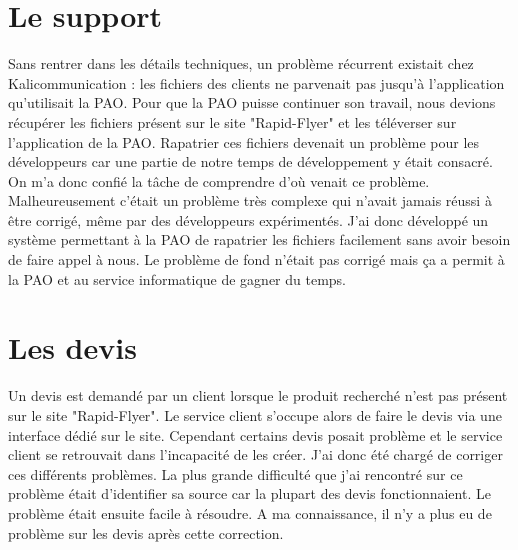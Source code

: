 
\section{Le support}
Sans rentrer dans les détails techniques, un problème récurrent existait chez Kalicommunication : les fichiers des clients ne parvenait pas jusqu'à l'application qu'utilisait la PAO. Pour que la PAO puisse continuer son travail, nous devions récupérer les fichiers présent sur le site "Rapid-Flyer" et les téléverser sur l'application de la PAO.\newline
Rapatrier ces fichiers devenait un problème pour les développeurs car une partie de notre temps de développement y était consacré.\newline
On m'a donc confié la tâche de comprendre d'où venait ce problème. Malheureusement c'était un problème très complexe qui n'avait jamais réussi à être corrigé, même par des développeurs expérimentés. J'ai donc développé un système permettant à la PAO de rapatrier les fichiers facilement sans avoir besoin de faire appel à nous. Le problème de fond n'était pas corrigé mais ça a permit à la PAO et au service informatique de gagner du temps.

\section{Les devis}
Un devis est demandé par un client lorsque le produit recherché n'est pas présent sur le site "Rapid-Flyer". Le service client s'occupe alors de faire le devis via une interface dédié sur le site. Cependant certains devis posait problème et le service client se retrouvait dans l'incapacité de les créer.\newline
J'ai donc été chargé de corriger ces différents problèmes. La plus grande difficulté que j'ai rencontré sur ce problème était d'identifier sa source car la plupart des devis fonctionnaient. Le problème était ensuite facile à résoudre. A ma connaissance, il n'y a plus eu de problème sur les devis après cette correction.